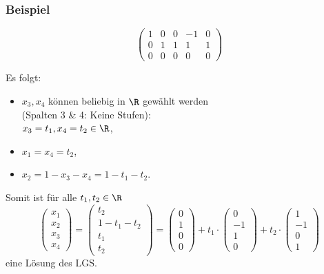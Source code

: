 \begin{frame}\frametitle{Beispiel}
	
	$$
		\left(
		\begin{array}{cccc|c}
			1 & 0 & 0 & -1 & 0\\
			0 & 1 & 1 & 1 & 1\\
			0 & 0 & 0 & 0 & 0
		\end{array}
		\right)
	$$
	
	Es folgt: \pause
	\begin{itemize}
		\item $x_3, x_4$ können beliebig in $\R$ gewählt werden\\ (Spalten 3 \& 4: Keine Stufen): \\
			 $x_3 = t_1, x_4 = t_2 \in \R$, \pause
		\item $x_1=x_4 = t_2$,	\pause	
		\item $x_2 = 1 - x_3 - x_4 = 1- t_1 - t_2$. \pause
	\end{itemize}
	
	\vspace{3mm}
	Somit ist für alle $t_1, t_2 \in \R$
	$$
		\begin{pmatrix}
			x_1\\
			x_2\\
			x_3\\
			x_4
		\end{pmatrix}		
		=
		\begin{pmatrix}
			t_2\\
			1-t_1-t_2\\
			t_1\\
			t_2
		\end{pmatrix}
		=		
		\begin{pmatrix}
			0\\
			1\\
			0\\
			0
		\end{pmatrix}
		+
		t_1
		\cdot
		\begin{pmatrix}
			0\\
			-1\\
			1\\
			0
		\end{pmatrix}
		+
		t_2
		\cdot
		\begin{pmatrix}
			1\\
			-1\\
			0\\
			1
		\end{pmatrix}		
	$$
	eine Lösung des LGS.
	
\end{frame}
